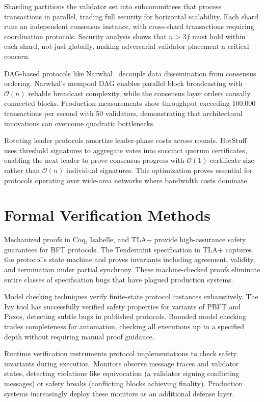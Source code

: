 \documentclass{article}
\begin{document}
Sharding partitions the validator set into subcommittees that process transactions in parallel, trading full security for horizontal scalability. Each shard runs an independent consensus instance, with cross-shard transactions requiring coordination protocols. Security analysis shows that $n > 3f$ must hold within each shard, not just globally, making adversarial validator placement a critical concern.

DAG-based protocols like Narwhal~\cite{danezis2022narwhal} decouple data dissemination from consensus ordering. Narwhal's mempool DAG enables parallel block broadcasting with $\mathcal{O}(n)$ reliable broadcast complexity, while the consensus layer orders causally connected blocks. Production measurements show throughput exceeding 100,000 transactions per second with 50 validators, demonstrating that architectural innovations can overcome quadratic bottlenecks.

Rotating leader protocols amortize leader-phase costs across rounds. HotStuff uses threshold signatures to aggregate votes into succinct quorum certificates, enabling the next leader to prove consensus progress with $\mathcal{O}(1)$ certificate size rather than $\mathcal{O}(n)$ individual signatures. This optimization proves essential for protocols operating over wide-area networks where bandwidth costs dominate.

\section{Formal Verification Methods}

Mechanized proofs in Coq, Isabelle, and TLA+ provide high-assurance safety guarantees for BFT protocols. The Tendermint specification in TLA+ captures the protocol's state machine and proves invariants including agreement, validity, and termination under partial synchrony. These machine-checked proofs eliminate entire classes of specification bugs that have plagued production systems.

Model checking techniques verify finite-state protocol instances exhaustively. The Ivy tool has successfully verified safety properties for variants of PBFT and Paxos, detecting subtle bugs in published protocols. Bounded model checking trades completeness for automation, checking all executions up to a specified depth without requiring manual proof guidance.

Runtime verification instruments protocol implementations to check safety invariants during execution. Monitors observe message traces and validator states, detecting violations like equivocation (a validator signing conflicting messages) or safety breaks (conflicting blocks achieving finality). Production systems increasingly deploy these monitors as an additional defense layer.
\end{document}
